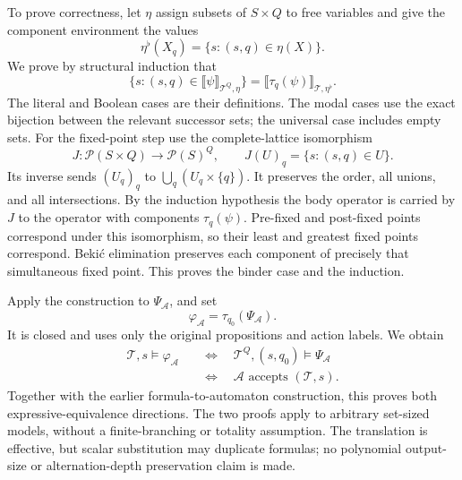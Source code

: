 To prove correctness, let \(\eta\)
assign subsets of \(S\times Q\)
to free variables and give the
component environment the values
\[
 \eta^\flat(X_q)
   =\{s:(s,q)\in\eta(X)\}.
\]
We prove by structural induction
that
\[
 \{s:(s,q)\in
       \llbracket\psi\rrbracket_{\mathcal T^Q,\eta}\}
   =\llbracket\tau_q(\psi)\rrbracket_
                                      {\mathcal T,\eta^\flat}.
\]
The literal and Boolean cases
are their definitions.
The modal cases use the exact
bijection between the relevant
successor sets; the universal
case includes empty sets.
For the fixed-point step use
the complete-lattice isomorphism
\[
 J:\mathcal P(S\times Q)\longrightarrow
                       \mathcal P(S)^Q,\qquad
 J(U)_q=\{s:(s,q)\in U\}.
\]
Its inverse sends \((U_q)_q\)
to \(\bigcup_q(U_q\times\{q\})\).
It preserves the order, all
unions, and all intersections.
By the induction hypothesis
the body operator is carried
by \(J\) to the operator with
components \(\tau_q(\psi)\).
Pre-fixed and post-fixed points
correspond under this isomorphism,
so their least and greatest
fixed points correspond.
Beki\'c elimination preserves
each component of precisely
that simultaneous fixed point.
This proves the binder case
and the induction.

Apply the construction to
\(\Psi_{\mathcal A}\), and set
\[
 \varphi_{\mathcal A}
       =\tau_{q_0}(\Psi_{\mathcal A}).
\]
It is closed and uses only
the original propositions and
action labels. We obtain
\[
\begin{aligned}
 \mathcal T,s\models\varphi_{\mathcal A}
 &\quad\Longleftrightarrow\quad
 \mathcal T^Q,(s,q_0)\models\Psi_{\mathcal A}\\
 &\quad\Longleftrightarrow\quad
 \mathcal A\text{ accepts }(\mathcal T,s).
\end{aligned}
\]
Together with the earlier
formula-to-automaton construction,
this proves both
expressive-equivalence directions.
The two proofs apply to arbitrary
set-sized models, without a
finite-branching or totality
assumption. The translation is
effective, but scalar substitution
may duplicate formulas; no
polynomial output-size or
alternation-depth preservation
claim is made.

